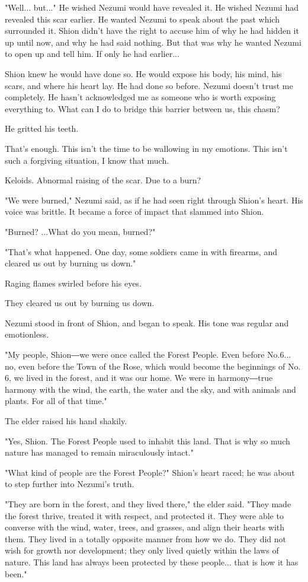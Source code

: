 "Well... but..." He wished Nezumi would have revealed it. He wished
Nezumi had revealed this scar earlier. He wanted Nezumi to speak about
the past which surrounded it. Shion didn't have the right to accuse him
of why he had hidden it up until now, and why he had said nothing. But
that was why he wanted Nezumi to open up and tell him. If only he had
earlier...

Shion knew he would have done so. He would expose his body, his mind,
his scars, and where his heart lay. He had done so before. Nezumi
doesn't trust me completely. He hasn't acknowledged me as someone who is
worth exposing everything to. What can I do to bridge this barrier
between us, this chasm?

He gritted his teeth.

That's enough. This isn't the time to be wallowing in my emotions. This
isn't such a forgiving situation, I know that much.

Keloids. Abnormal raising of the scar. Due to a burn?

"We were burned," Nezumi said, as if he had seen right through Shion's
heart. His voice was brittle. It became a force of impact that slammed
into Shion.

"Burned? ...What do you mean, burned?"

"That's what happened. One day, some soldiers came in with firearms, and
cleared us out by burning us down."

Raging flames swirled before his eyes.

They cleared us out by burning us down.

Nezumi stood in front of Shion, and began to speak. His tone was regular
and emotionless.

"My people, Shion―we were once called the Forest People. Even before
No.6... no, even before the Town of the Rose, which would become the
beginnings of No. 6, we lived in the forest, and it was our home. We
were in harmony―true harmony with the wind, the earth, the water and the
sky, and with animals and plants. For all of that time."

The elder raised his hand shakily.

"Yes, Shion. The Forest People used to inhabit this land. That is why so
much nature has managed to remain miraculously intact."

"What kind of people are the Forest People?" Shion's heart raced; he was
about to step further into Nezumi's truth.

"They are born in the forest, and they lived there," the elder said.
"They made the forest thrive, treated it with respect, and protected it.
They were able to converse with the wind, water, trees, and grasses, and
align their hearts with them. They lived in a totally opposite manner
from how we do. They did not wish for growth nor development; they only
lived quietly within the laws of nature. This land has always been
protected by these people... that is how it has been."

